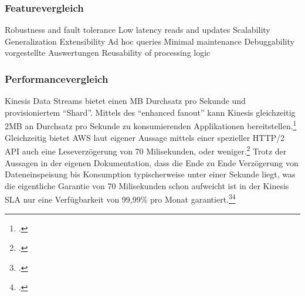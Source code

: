 \subsubsection{Featurevergleich} 
Robustness and fault tolerance
Low latency reads and updates
Scalability
Generalization
Extensibility
Ad hoc queries
Minimal maintenance
Debuggability
vorgestellte Auswertungen 
Reusability of processing logic

\subsubsection{Performancevergleich}
Kinesis Data Streams bietet einen MB Durchsatz pro Sekunde und provisioniertem \enquote{Shard}. Mittels des \enquote{enhanced fanout} kann Kinesis gleichzeitig 2MB an Durchsatz pro Sekunde zu konsumierenden Applikationen bereitstellen.\footcite[Vgl. auch im Folgenden][]{Hunt.2018} Gleichzeitig bietet \ac{AWS} laut eigener Aussage mittels einer spezieller HTTP/2 \ac{API} auch eine Leseverzögerung von 70 Milisekunden, oder weniger.\footcite[Vgl.][]{AmazonWebServicesInc..o.J.af} Trotz der Aussagen in der eigenen Dokumentation, dass die Ende zu Ende Verzögerung von Dateneinspeisung bis Konsumption typischerweise unter einer Sekunde liegt, was die eigentliche Garantie von 70 Milisekunden schon aufweicht  ist in der Kinesis \ac{SLA} nur eine Verfügbarkeit von 99,99\% pro Monat garantiert.\footcite[Vgl.][]{AmazonWebServicesInc..o.J.ae}\nzitat\footcite[Vgl.][]{AmazonWebServicesInc..o.J.ad}

